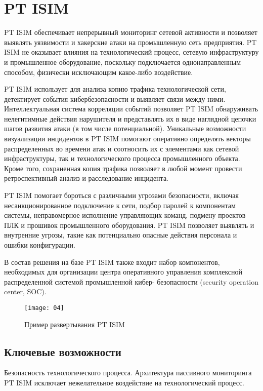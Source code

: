 \section{PT ISIM}
PT ISIM обеспечивает непрерывный мониторинг сетевой активности и позволяет выявлять уязвимости и хакерские атаки на промышленную сеть предприятия. PT ISIM не оказывает влияния на технологический процесс, сетевую инфраструктуру и промышленное оборудование, поскольку подключается однонаправленным способом, физически исключающим какое-либо воздействие.\par

PT ISIM использует для анализа копию трафика технологической сети, детектирует события кибербезопасности и выявляет связи между ними. Интеллектуальная система корреляции событий позволяет PT ISIM обнаруживать нелегитимные действия нарушителя и представлять их в виде наглядной цепочки шагов развития атаки (в том числе потенциальной). Уникальные возможности визуализации инцидентов в PT ISIM помогают оперативно определять векторы распределенных во времени атак и соотносить их с элементами как сетевой инфраструктуры, так и технологического процесса промышленного объекта. Кроме того, сохраненная копия трафика позволяет в любой момент провести ретроспективный анализ и расследование инцидента.\par

PT ISIM помогает бороться с различными угрозами безопасности, включая несанкционированное подключение к сети, подбор паролей к компонентам системы, неправомерное исполнение управляющих команд, подмену проектов ПЛК и прошивок промышленного оборудования. PT ISIM позволяет выявлять и внутренние угрозы, такие как потенциально опасные действия персонала и ошибки конфигурации.\par

В состав решения на базе PT ISIM также входит набор компонентов, необходимых для организации центра оперативного управления комплексной распределенной системой промышленной кибер- безопасности (security operation center, SOC).\par

\clearpage

\begin{figure}[h!]
    \centering
    \texttt{[image: 04]}
    \caption{Пример развертывания PT ISIM}
    \label{img:04}
\end{figure}

\subsection{Ключевые возможности}
­Безопасность технологического процесса. Архитектура пассивного мониторинга PT ISIM исключает нежелательное воздействие на технологический процесс.\par

